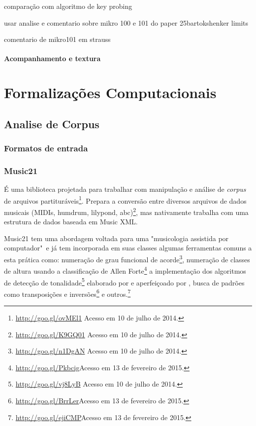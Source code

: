 \documentclass[
	12pt,				%
	openright,			%
	twoside,			%
	a4paper,			%
	english,			%
	french,				%
	spanish,			%
	brazil				%
	]{abntex2}
\begin{document}
comparação com algoritmo de key probing
\cite{cooper1998unfolding}


usar analise e comentario sobre mikro 100 e 101 do paper 25bartokshenker limits
\cite[ p.179]{brown1997iv}

comentario de  mikro101 em strauss
\cite[ p.113]{straus2004}

\subsection{Acompanhamento e textura}


\cite{starr1985melody}






%
%
%

\part{Formalizações Computacionais}

\chapter{Analise de Corpus}

\section{Formatos de entrada}

\section{Music21}

É uma biblioteca projetada para trabalhar com manipulação e análise de \textit{corpus} de arquivos partituráveis\footnote{\url{http://goo.gl/ovMEl1} Acesso em 10 de julho de 2014.}. Prepara a conversão entre diversos arquivos de dados musicais (MIDIs, humdrum, lilypond, abc)\footnote{\url{http://goo.gl/K9GQ01} Acesso em 10 de julho de 2014.}, mas nativamente trabalha com uma estrutura de dados baseada em Music XML.

Music21 tem uma abordagem voltada para uma "musicologia assistida por computador"\ e já tem incorporada em suas classes algumas ferramentas comuns a esta prática como: numeração de grau funcional de acorde\footnote{\url{http://goo.gl/n1DgAN} Acesso em 10 de julho de 2014.}, numeração de classes de altura usando a classificação de Allen Forte\footnote{\url{http://goo.gl/Pkbcig}Acesso em 13 de fevereiro de 2015.} a implementação dos algoritmos de detecção de tonalidade\footnote{\url{http://goo.gl/vj8LyB} Acesso em 10 de julho de 2014.} elaborado por  e aperfeiçoado por , busca de padrões como transposições e inversões\footnote{\url{http://goo.gl/BrrLer}Acesso em 13 de fevereiro de 2015.} e outros.\footnote{{\url{http://goo.gl/ejiCMP}Acesso em 13 de fevereiro de 2015.}}
\end{document}
